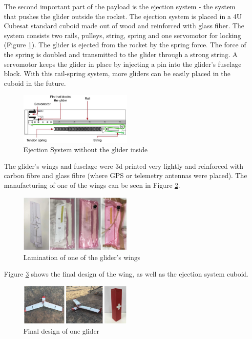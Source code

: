 The second important part of the payload is the ejection system - the system that pushes the glider outside the rocket.
The ejection system is placed in a 4U Cubesat standard cuboid made out of wood and reinforced with glass fiber. The system consists two rails, pulleys, string, spring and one servomotor for locking (Figure \ref{fig:ejection}). The glider is ejected from the rocket by the spring force. The force of the spring is doubled and transmitted to the glider through a strong string. A servomotor keeps the glider in place by injecting a pin into the glider's fuselage block. With this rail-spring system, more gliders can be easily placed in the cuboid in the future.

\begin{figure}[h!]
    \centering
        \includegraphics[width=0.5\textwidth]{img/ejection_system.JPG}
        \caption{Ejection System without the glider inside}
        \label{fig:ejection}
 \end{figure}

The glider's wings and fuselage were 3d printed very lightly and reinforced with carbon fibre and glass fibre (where GPS or telemetry antennas were placed). The manufacturing of one of the wings can be seen in Figure \ref{fig:manufact}.

\begin{figure}[h!]
    \centering
        \includegraphics[width=0.5\textwidth]{img/manuf.jpg}
        \caption{Lamination of one of the glider's wings}
        \label{fig:manufact}
 \end{figure}


Figure \ref{fig:final} shows the final design of the wing, as well as the ejection system cuboid.



\begin{figure}[h!]
    \centering
        \includegraphics[width=0.5\textwidth]{img/final.jpg}
        \caption{Final design of one glider}
        \label{fig:final}
 \end{figure}

